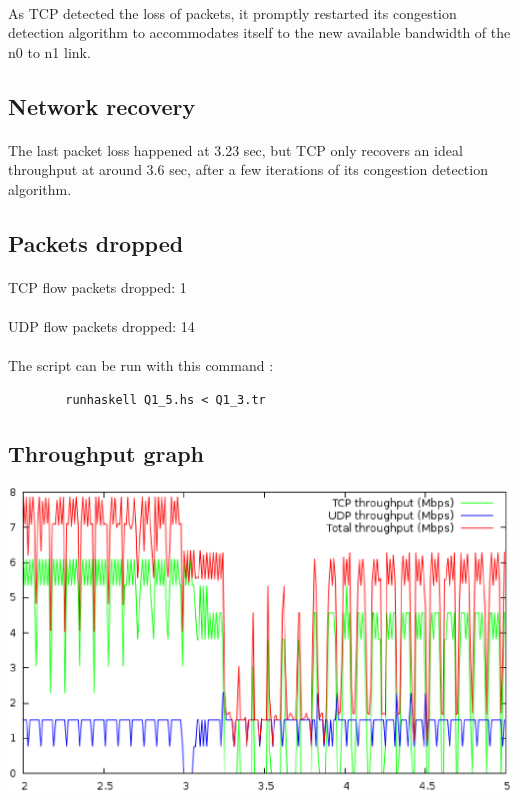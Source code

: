 \documentclass[a4paper]{article}
\begin{document}
    \paragraph{}As TCP detected the loss of packets, it promptly restarted its
congestion detection algorithm to accommodates itself to the new available
bandwidth of the n0 to n1 link.

   \subsection{Network recovery}
   \label{Network recovery}

   \paragraph{}The last packet loss happened at 3.23 sec, but TCP only recovers
an ideal throughput at around 3.6 sec, after a few iterations of its congestion
detection algorithm.

   \subsection{Packets dropped}

   \paragraph{}TCP flow packets dropped: 1
   \paragraph{}UDP flow packets dropped: 14

    \paragraph{}The script can be run with this command :
    \begin{verbatim}
        runhaskell Q1_5.hs < Q1_3.tr
    \end{verbatim}

   \subsection{Throughput graph}

    \begin{center}
        \includegraphics[width=\textwidth]{question1/Q1_6.eps}
    \end{center}
\end{document}
